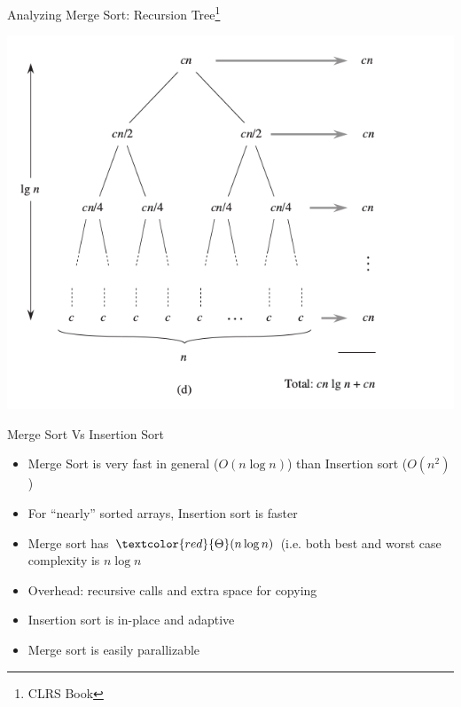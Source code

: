 \documentclass{beamer}
\newcommand{\hred}[1]{{\textcolor{red}{#1}}}
\begin{document}
\begin{frame}{Analyzing Merge Sort: Recursion Tree\footnote{CLRS Book}}
\begin{center}
    \includegraphics[scale=0.4]{mergeSortRecursionTree2.png}
\end{center}
\end{frame}


\begin{frame}{Merge Sort Vs Insertion Sort}
\begin{itemize}
\item Merge Sort is very fast in general ($O(n \log n)$) than Insertion sort ($O(n^2)$)
\item For ``nearly'' sorted arrays, Insertion sort is faster
\item Merge sort has $\hred{\Theta}(n \log n)$ (i.e. both best and worst case complexity is $n \log n$
\item Overhead: recursive calls and extra space for copying
\item Insertion sort is in-place and adaptive
\item Merge sort is easily parallizable 
\end{itemize}
\end{frame}

\end{document}
